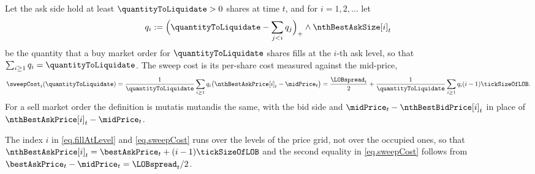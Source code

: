 \begin{defi}
Let the ask side hold at least $\quantityToLiquidate > 0$ shares at time $t$,
and for $i=1,2,\dots$ let
\begin{equation}
\label{eq.fillAtLevel}
q_i
:=
\Big( \quantityToLiquidate - \sum_{j<i} q_j \Big)_{+} \wedge \nthBestAskSize[i]_t
\end{equation}
be the quantity that a buy market order for $\quantityToLiquidate$ shares fills
at the $i$-th ask level, so that $\sum_{i\geq1} q_i = \quantityToLiquidate$.
The sweep cost is its per-share cost measured against the mid-price,
\begin{equation}
\label{eq.sweepCost}
\sweepCost_t(\quantityToLiquidate)
=
\frac{1}{\quantityToLiquidate}\sum_{i\geq1} q_i \big(\nthBestAskPrice[i]_t - \midPrice_t\big)
=
\frac{\LOBspread_t}{2}
+
\frac{1}{\quantityToLiquidate}\sum_{i\geq1} q_i (i - 1)\tickSizeOfLOB .
\end{equation}
For a sell market order the definition is mutatis mutandis the same,
with the bid side and $\midPrice_t - \nthBestBidPrice[i]_t$ in place of
$\nthBestAskPrice[i]_t - \midPrice_t$.
\end{defi}
The index $i$ in \eqref{eq.fillAtLevel} and \eqref{eq.sweepCost} runs over the levels of the
price grid, not over the occupied ones,
so that $\nthBestAskPrice[i]_t = \bestAskPrice_t + (i-1)\tickSizeOfLOB$
and the second equality in \eqref{eq.sweepCost} follows from
$\bestAskPrice_t - \midPrice_t = \LOBspread_t/2$.

